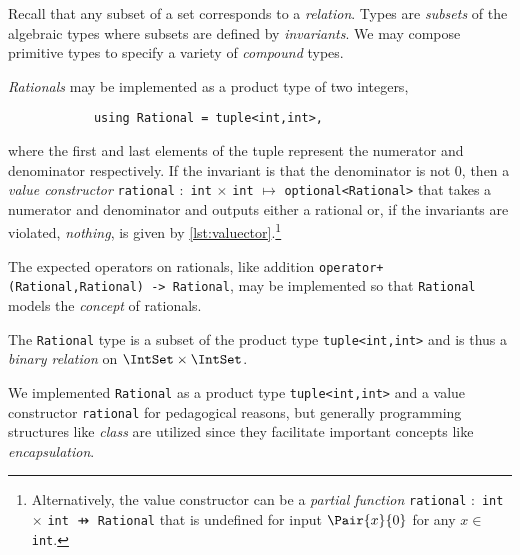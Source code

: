 \documentclass[ ../main.tex]{subfiles}
\begin{document}
	Recall that any subset of a set corresponds to a \emph{relation}. Types are \emph{subsets} of the algebraic types where subsets are defined by \emph{invariants}.
	We may compose primitive types to specify a variety of \emph{compound} types.
	\begin{example}
		\emph{Rationals} may be implemented as a product type of two integers,
		\begin{verbatim}
			using Rational = tuple<int,int>,
		\end{verbatim}
		where the first and last elements of the tuple represent the numerator and denominator respectively.
		If the invariant is that the denominator is not $0$, then a \emph{value constructor} \texttt{rational} $\colon$ \texttt{int} $\times$ \texttt{int} $\mapsto$ \texttt{optional<Rational>} that takes a numerator and denominator and outputs either a rational or, if the invariants are violated, \emph{nothing}, is given by \cref{lst:valuector}.\footnote{Alternatively, the value constructor can be a \emph{partial function} \texttt{rational} $\colon$ \texttt{int} $\times$ \texttt{int} $\pfun$ \texttt{Rational} that is undefined for input $\Pair{x}{0}$ for any $x \in$ \texttt{int}.}
		
		
		The expected operators on rationals, like addition \texttt{operator+(Rational,Rational) -> Rational}, may be implemented so that \texttt{Rational} models the \emph{concept} of rationals.
		
		The \texttt{Rational} type is a subset of the product type \texttt{tuple<int,int>} and is thus
		a \emph{binary relation} on $\IntSet \times \IntSet$.
		\begin{remark}
			We implemented \texttt{Rational} as a product type \texttt{tuple<int,int>} and a value constructor \texttt{rational} for pedagogical reasons, but generally programming structures like \emph{class} are utilized since they facilitate important concepts like \emph{encapsulation}.
		\end{remark}
	\end{example}
	
\end{document}
